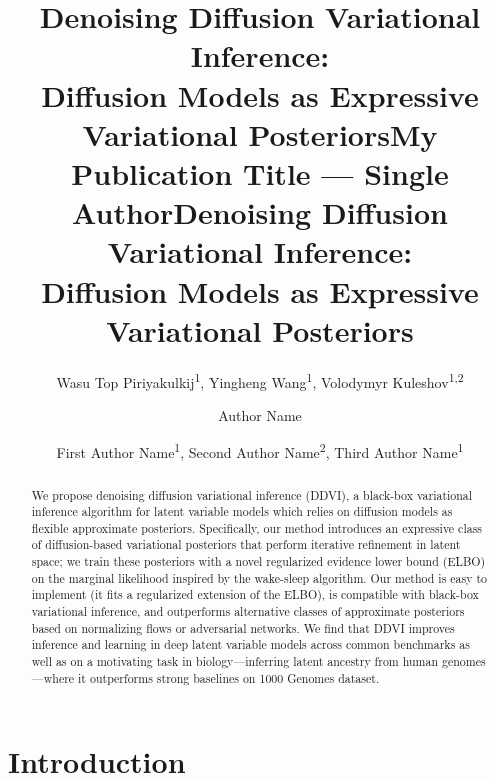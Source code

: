 \documentclass[letterpaper]{article} %
\title{Denoising Diffusion Variational Inference: \\ Diffusion Models as Expressive Variational Posteriors}
\author{
    Wasu Top Piriyakulkij\equalcontrib\textsuperscript{\rm 1},
    Yingheng Wang\equalcontrib\textsuperscript{\rm 1},
    Volodymyr Kuleshov\textsuperscript{\rm 1,2}
}
\title{My Publication Title --- Single Author}
\author {
    Author Name
}
\title{Denoising Diffusion Variational Inference: \\ Diffusion Models as Expressive Variational Posteriors}
\author {
    First Author Name\textsuperscript{\rm 1},
    Second Author Name\textsuperscript{\rm 2},
    Third Author Name\textsuperscript{\rm 1}
}
\begin{document}
\maketitle

\begin{abstract}
We propose denoising diffusion variational inference (DDVI), a black-box variational inference algorithm for latent variable models which relies on diffusion models
as flexible approximate posteriors. 
Specifically, our method introduces
an expressive class of diffusion-based variational posteriors that perform iterative refinement in latent space; we train these posteriors with a novel regularized evidence lower bound (ELBO) on the marginal likelihood inspired by the wake-sleep algorithm. 
Our method is easy to implement (it fits a regularized extension of the ELBO), is compatible with black-box variational inference, and outperforms alternative classes of approximate posteriors based on normalizing flows or adversarial networks.
We find that DDVI improves inference and learning in deep latent variable models across common benchmarks as well as on a motivating task in biology---inferring latent ancestry from human genomes---where it outperforms strong baselines on 1000 Genomes dataset.
\end{abstract}

\section{Introduction}


\end{document}
